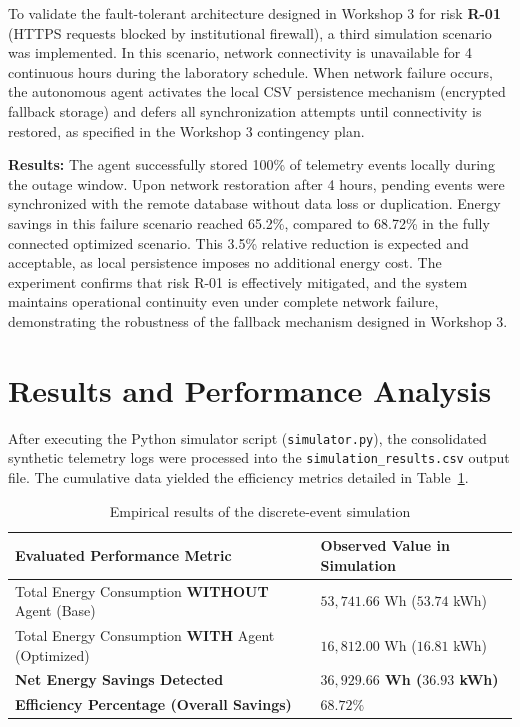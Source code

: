 \documentclass[12pt,a4paper]{article}
\begin{document}
To validate the fault-tolerant architecture designed in Workshop 3 for risk \textbf{R-01} (HTTPS requests blocked by institutional firewall), a third simulation scenario was implemented. In this scenario, network connectivity is unavailable for 4 continuous hours during the laboratory schedule. When network failure occurs, the autonomous agent activates the local CSV persistence mechanism (encrypted fallback storage) and defers all synchronization attempts until connectivity is restored, as specified in the Workshop 3 contingency plan.

\textbf{Results:} The agent successfully stored 100\% of telemetry events locally during the outage window. Upon network restoration after 4 hours, pending events were synchronized with the remote database without data loss or duplication. Energy savings in this failure scenario reached 65.2\%, compared to 68.72\% in the fully connected optimized scenario. This 3.5\% relative reduction is expected and acceptable, as local persistence imposes no additional energy cost. The experiment confirms that risk R-01 is effectively mitigated, and the system maintains operational continuity even under complete network failure, demonstrating the robustness of the fallback mechanism designed in Workshop 3.

\section{Results and Performance Analysis}

After executing the Python simulator script (\texttt{simulator.py}), the consolidated synthetic telemetry logs were processed into the \texttt{simulation\_results.csv} output file. The cumulative data yielded the efficiency metrics detailed in Table~\ref{tab:results}.

\begin{table}[H]
\caption{Empirical results of the discrete-event simulation}
\label{tab:results}
\centering
\begin{tabular}{|>{\raggedright\arraybackslash}p{6.5cm}|>{\centering\arraybackslash}p{4.5cm}|}
\hline
\textbf{Evaluated Performance Metric} & \textbf{Observed Value in Simulation} \\
\hline
Total Energy Consumption \textbf{WITHOUT} Agent (Base) & $53,741.66$ Wh ($53.74$ kWh) \\
\hline
Total Energy Consumption \textbf{WITH} Agent (Optimized) & $16,812.00$ Wh ($16.81$ kWh) \\
\hline
\textbf{Net Energy Savings Detected} & \textbf{$36,929.66$ Wh ($36.93$ kWh)} \\
\hline
\textbf{Efficiency Percentage (Overall Savings)} & \textbf{$68.72\%$} \\
\hline
\end{tabular}
\end{table}
\end{document}
